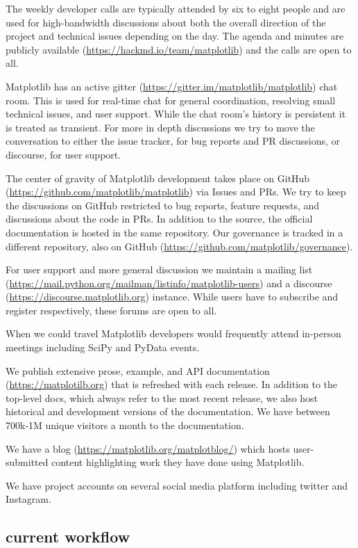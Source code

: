 \documentclass[12pt]{article}
\numberwithin{page}{section}
\begin{document}
The weekly developer calls are typically attended by six to eight
people and are used for high-bandwidth discussions about both the
overall direction of the project and technical issues depending on the
day.  The agenda and minutes are publicly
available (\url{https://hackmd.io/team/matplotlib}) and the
calls are open to all.

Matplotlib has an active
gitter (\url{https://gitter.im/matplotlib/matplotlib}) chat
room.  This is used for real-time chat for general coordination,
resolving small technical issues, and user support.  While the chat
room's history is persistent it is treated as transient.  For more in
depth discussions we try to move the conversation to either the issue
tracker, for bug reports and PR discussions, or discourse, for user
support.

The center of gravity of Matplotlib development takes place on
GitHub (\url{https://github.com/matplotlib/matplotlib}) via
Issues and PRs.  We try to keep the discussions on GitHub restricted
to bug reports, feature requests, and discussions about the code in
PRs.  In addition to the source, the official documentation is hosted
in the same repository.  Our governance is tracked in a different
repository, also on
GitHub (\url{https://github.com/matplotlib/governance}).

For user support and more general discussion we maintain a mailing
list (\url{https://mail.python.org/mailman/listinfo/matplotlib-users})
and a discourse (\url{https://discourse.matplotlib.org})
instance.  While users have to subscribe and register respectively,
these forums are open to all.

When we could travel Matplotlib developers would frequently attend
in-person meetings including SciPy and PyData events.

We publish extensive prose, example, and API
documentation (\url{https://matplotilb.org}) that is
refreshed with each release.  In addition to the top-level docs, which
always refer to the most recent release, we also host historical and
development versions of the documentation.  We have between 700k-1M
unique visitors a month to the documentation.

We have a blog (\url{https://matplotlib.org/matplotblog/})
which hosts user-submitted content highlighting work they have done
using Matplotlib.

We have project accounts on several social media platform including
twitter and Instagram.


\subsection{current workflow}
\end{document}
